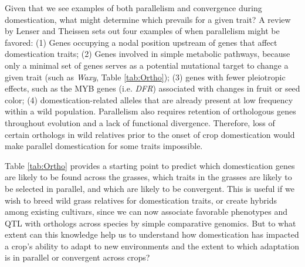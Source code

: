\documentclass[12pt]{article}
\begin{document}
Given that we see examples of both parallelism and convergence during domestication, what might determine which prevails for a given trait?
A review by Lenser and Theissen \citep{Lenser2013} sets out four examples of when parallelism might be favored: (1) Genes occupying a nodal position upstream of genes that affect domestication traits; (2) Genes involved in simple metabolic pathways, because only a minimal set of genes serves as a potential mutational target to change a given trait (such as \textit{Waxy}, Table \ref{tab:Ortho}); (3) genes with fewer pleiotropic effects, such as the MYB genes (i.e. \textit{DFR}) associated with changes in fruit or seed color; (4) domestication-related alleles that are already present at low frequency within a wild population. 
Parallelism also requires retention of orthologous genes throughout evolution and a lack of functional divergence.
Therefore, loss of certain orthologs in wild relatives prior to the onset of crop domestication would make parallel domestication for some traits impossible.

Table \ref{tab:Ortho} provides a starting point to predict which domestication genes are likely to be found across the grasses, which traits in the grasses are likely to be selected in parallel, and which are likely to be convergent.
This is useful if we wish to breed wild grass relatives for domestication traits, or create hybrids among existing cultivars, since we can now associate favorable phenotypes and QTL with orthologs across species by simple comparative genomics.
But to what extent can this knowledge help us to understand how domestication has impacted a crop's ability to adapt to new environments and the extent to which adaptation is in parallel or convergent across crops?

\paragraph{}
\end{document}
